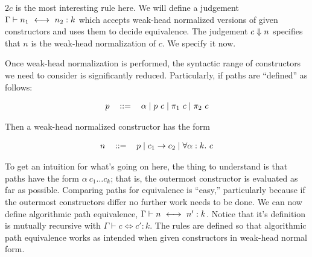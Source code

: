 \documentclass{article}
\newcommand{\type}{\ensuremath{\mathtt{type}}}
\begin{document}
$2c$ is the most interesting rule here. We will define a judgement $\Gamma
\vdash n_1 \ \longleftrightarrow\  n_2 : k$ which accepts weak-head normalized versions of given
constructors and uses them to decide equivalence. The judgement $c \Downarrow n$
specifies that $n$ is the weak-head normalization of $c$. We specify it now.


Once weak-head normalization is performed, the syntactic range of constructors
we need to consider is significantly reduced. Particularly, if paths are
``defined'' as follows:

\[
\begin{tabular}{lcl}
    $p$ & $::=$ & $\alpha \mid p \ c \mid \pi_1 \ c \mid \pi_2 \ c$
\end{tabular}
\]

Then a weak-head normalized constructor has the form

\[
    \begin{tabular}{lcl}
        $n$ & $::=$ & $p \mid c_1 \to c_2 \mid \forall \alpha : k. \ c$
    \end{tabular}
\]

To get an intuition for what's going on here, the thing to understand is that
paths have the form $\alpha \ c_1 \dots c_k$; that is, the outermost constructor
is evaluated as far as possible. Comparing paths for equivalence is ``easy,''
particularly because if the outermost constructors differ no further work needs
to be done. We can now define algorithmic path equivalence, $\Gamma \vdash n
\ \longleftrightarrow\  n' : k$. Notice that it's definition is mutually recursive with $\Gamma
\vdash c \iff c' : k$. The rules are defined so that algorithmic path
equivalence works as intended when given constructors in weak-head normal form.

\end{document}
